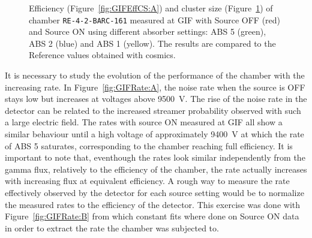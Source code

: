 \begin{figure}[H]
\begin{subfigure}{0.5\linewidth}
        	\caption{\label{fig:GIFEffCS:B}}
    	\end{subfigure}
		\caption{\label{fig:GIFEffCS} Efficiency (Figure~\ref{fig:GIFEffCS:A}) and cluster size (Figure~\ref{fig:GIFEffCS:B}) of chamber \texttt{RE-4-2-BARC-161} measured at GIF with Source OFF (red) and Source ON using different absorber settings: ABS 5 (green), ABS 2 (blue) and ABS 1 (yellow). The results are compared to the Reference values obtained with cosmics.}
	\end{figure}
	
	It is necessary to study the evolution of the performance of the chamber with the increasing rate. In Figure~\ref{fig:GIFRate:A}, the noise rate when the source is OFF stays low but increases at voltages above \SI{9500}{V}. The rise of the noise rate in the detector can be related to the increased streamer probability observed with such a large electric field. The rates with source ON measured at GIF all show a similar behaviour until a high voltage of approximately \SI{9400}{V} at which the rate of ABS 5 saturates, corresponding to the chamber reaching full efficiency. It is important to note that, eventhough the rates look similar independently from the gamma flux, relatively to the efficiency of the chamber, the rate actually increases with increasing flux at equivalent efficiency. A rough way to measure the rate effectively observed by the detector for each source setting would be to normalize the measured rates to the efficiency of the detector. This exercise was done with Figure~\ref{fig:GIFRate:B} from which constant fits where done on Source ON data in order to extract the rate the chamber was subjected to.
	
